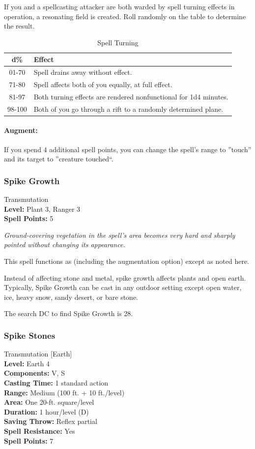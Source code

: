 If you and a spellcasting attacker are both warded by spell turning effects in operation, 
a resonating field is created. Roll randomly on the  table to determine the result.
\begin{table}
\label{tab:SpellTurning}
\caption{Spell Turning}
\begin{center}
\begin{tabular}{|c|l|}
\hline
d\%&Effect\\
\hline
01-70&Spell drains away without effect.\\
71-80&Spell affects both of you equally, at full effect.\\
81-97&Both turning effects are rendered nonfunctional for 1d4 minutes.\\
98-100&Both of you go through a rift to a randomly determined plane.\\
\hline
\end{tabular}
\end{center}
\end{table}
\paragraph{Augment:} If you spend 4 additional spell points, you can change the spell's range to ''touch'' and its target to ''creature touched``. 
\subsubsection{Spike Growth}
\label{Spell:SpikeGrowth}
Transmutation
\\ \textbf{Level:} Plant 3, Ranger 3
\\ \textbf{Spell Points:} 5

\emph{Ground-covering vegetation in the spell's area becomes very hard and sharply pointed without changing its appearance.}

This spell functions as  (including the augmentation option) except as noted here.

Instead of affecting stone and metal, spike growth affects plants and open earth. Typically, Spike Growth can be cast in any outdoor setting except open water, ice, heavy snow, sandy desert, or bare stone.

The search DC to find Spike Growth is 28.
\subsubsection{Spike Stones}
\label{Spell:SpikeStones}
Transmutation [Earth]
\\ \textbf{Level:} Earth 4
\\ \textbf{Components:} V, S
\\ \textbf{Casting Time:} 1 standard action
\\ \textbf{Range:} Medium (100 ft. + 10 ft./level)
\\ \textbf{Area:} One 20-ft. square/level
\\ \textbf{Duration:} 1 hour/level (D)
\\ \textbf{Saving Throw:} Reflex partial
\\ \textbf{Spell Resistance:} Yes
\\ \textbf{Spell Points:} 7

